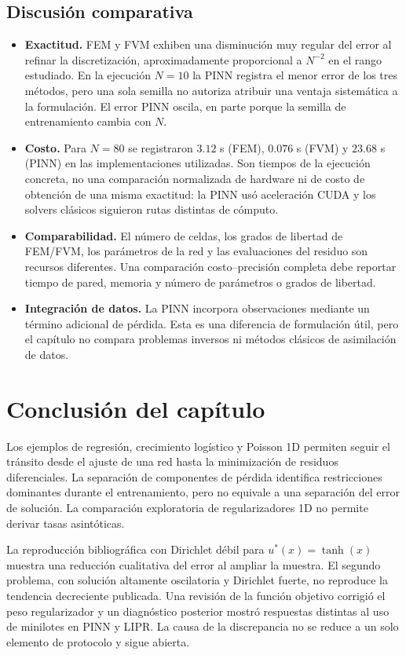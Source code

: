 \subsection*{Discusión comparativa}
\begin{itemize}
  \item \textbf{Exactitud.} FEM y FVM exhiben una disminución muy regular del error al refinar la discretización, aproximadamente proporcional a $N^{-2}$ en el rango estudiado. En la ejecución $N=10$ la PINN registra el menor error de los tres métodos, pero una sola semilla no autoriza atribuir una ventaja sistemática a la formulación. El error PINN oscila, en parte porque la semilla de entrenamiento cambia con $N$.
  \item \textbf{Costo.} Para $N=80$ se registraron $3.12$ s (FEM), $0.076$ s (FVM) y $23.68$ s (PINN) en las implementaciones utilizadas. Son tiempos de la ejecución concreta, no una comparación normalizada de hardware ni de costo de obtención de una misma exactitud: la PINN usó aceleración CUDA y los solvers clásicos siguieron rutas distintas de cómputo.
  \item \textbf{Comparabilidad.} El número de celdas, los grados de libertad de FEM/FVM, los parámetros de la red y las evaluaciones del residuo son recursos diferentes. Una comparación costo--precisión completa debe reportar tiempo de pared, memoria y número de parámetros o grados de libertad.
  \item \textbf{Integración de datos.} La PINN incorpora observaciones mediante un término adicional de pérdida. Esta es una diferencia de formulación útil, pero el capítulo no compara problemas inversos ni métodos clásicos de asimilación de datos.
\end{itemize}

\section*{Conclusión del capítulo}

Los ejemplos de regresión, crecimiento logístico y Poisson 1D permiten seguir el tránsito desde el ajuste de una red hasta la minimización de residuos diferenciales. La separación de componentes de pérdida identifica restricciones dominantes durante el entrenamiento, pero no equivale a una separación del error de solución. La comparación exploratoria de regularizadores 1D no permite derivar tasas asintóticas.

La reproducción bibliográfica con Dirichlet débil para $u^*(x)=\tanh(x)$ muestra una reducción cualitativa del error al ampliar la muestra. El segundo problema, con solución altamente oscilatoria y Dirichlet fuerte, no reproduce la tendencia decreciente publicada. Una revisión de la función objetivo corrigió el peso regularizador y un diagnóstico posterior mostró respuestas distintas al uso de minilotes en PINN y LIPR. La causa de la discrepancia no se reduce a un solo elemento de protocolo y sigue abierta.

